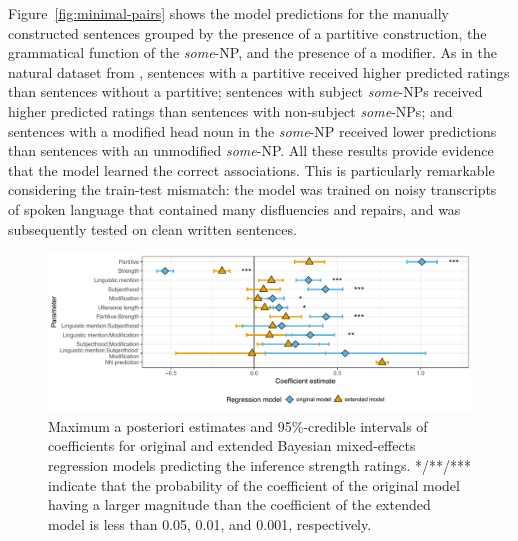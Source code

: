 \documentclass[11pt,a4paper]{article}
\newcommand{\figref}[1]{Figure~\ref{#1}}
\begin{document}
\figref{fig:minimal-pairs} shows the model predictions for the manually constructed sentences grouped by the presence of a partitive construction, the grammatical function of the \emph{some}-NP, and the presence of a modifier. As in the natural dataset from \citet{degen2015investigating}, sentences with a partitive received higher predicted ratings than sentences without a partitive; sentences with subject \emph{some}-NPs received higher predicted ratings than sentences with non-subject \emph{some}-NPs; and sentences with a modified head noun in the \emph{some}-NP received lower predictions than sentences with an unmodified \emph{some}-NP. All these results provide evidence that the model learned the correct associations. This is particularly remarkable considering the train-test mismatch: the model was trained on noisy transcripts of spoken language that contained many disfluencies and repairs, and was subsequently tested on clean written sentences.    

\begin{figure}[t]
\center
\includegraphics[width=\textwidth,trim={0 0.4cm 0 0},clip,width=\textwidth]{./images/cv-coefficient-estimates.pdf}
\caption{Maximum a posteriori estimates and 95\%-credible intervals of coefficients for original and extended Bayesian mixed-effects regression models predicting the inference strength ratings. */**/*** indicate that the probability of the coefficient of the original model having a larger magnitude than the coefficient of the extended model is less than 0.05, 0.01, and 0.001, respectively.}
	\label{fig:cv-coefficients}
\end{figure} 
\end{document}
